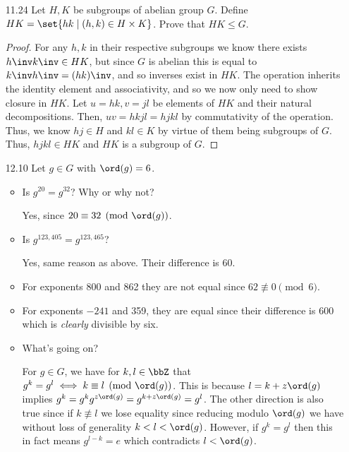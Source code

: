 \documentclass{article}
\begin{document}
\begin{enumerate}
  \item[11.24\rparen] Let $H, K$ be subgroups of abelian group $G$.
        Define $HK = \set{ hk \mid (h, k) \in H \times K }$.
        Prove that $HK \le G$.
        \begin{proof}
          For any $h, k$ in their respective subgroups we
          know there exists $h\inv k\inv \in HK$, but since $G$ is abelian this is equal
          to $k\inv h\inv = (hk)\inv$, and so inverses exist in $HK$.
          The operation inherits the identity element and associativity,
          and so we now only need to show closure in $HK$.
          Let $u = hk, v = jl$ be elements of $HK$ and their natural decompositions.
          Then, $uv = hkjl = hjkl$ by commutativity of the operation.
          Thus, we know $hj \in H$ and $kl \in K$ by virtue of them being subgroups of $G$.
          Thus, $hjkl \in HK$ and $HK$ is a subgroup of $G$.
        \end{proof}

  \item[12.10\rparen] Let $g \in G$ with $\ord(g) = 6$.
        \begin{itemize}
          \item Is $g^{20} = g^{32}$? Why or why not?

                Yes, since $20 \equiv 32 \pmod{\ord(g)}$.

          \item Is $g^{123,405} = g^{123,465}$?

                Yes, same reason as above. Their difference is 60.

          \item For exponents 800 and 862 they are not equal since $62 \not\equiv 0 \pmod{6}$.

          \item For exponents $-241$ and 359, they are equal since their difference is 600 which
                is \emph{clearly} divisible by six.

          \item What's going on?

                For $g \in G$, we have for $k, l \in \bbZ$ that $g^{k} = g^{l} \iff k \equiv l \pmod{\ord(g)}$.
                This is because $l = k + z\ord(g)$ implies $g^{k} = g^{k}g^{z\ord(g)} = g^{k + z\ord(g)} = g^{l}$.
                The other direction is also true since if $k \not\equiv l$ we lose equality since reducing modulo $\ord(g)$
                we have without loss of generality $k < l < \ord(g)$.
                However, if $g^{k} = g^{l}$ then this in fact means $g^{l - k} = e$ which contradicts $l < \ord(g)$.
        \end{itemize}


\end{enumerate}
\end{document}
